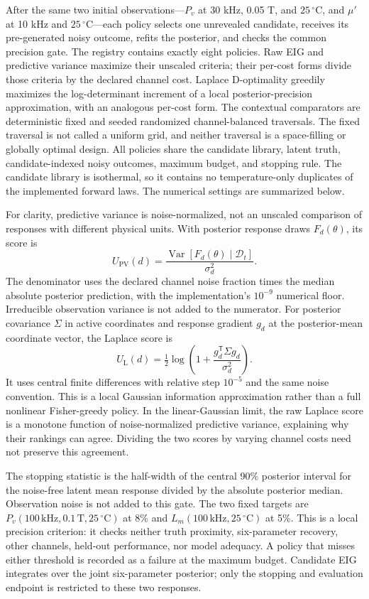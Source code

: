 After the same two initial observations---\(P_v\) at 30 kHz, 0.05 T, and
\(25\,^{\circ}\mathrm C\), and \(\mu'\) at 10 kHz and
\(25\,^{\circ}\mathrm C\)---each policy selects one unrevealed
candidate, receives its pre-generated noisy outcome, refits the
posterior, and checks the common precision gate. The registry contains
exactly eight policies. Raw EIG and predictive variance maximize their
unscaled criteria; their per-cost forms divide those criteria by the
declared channel cost. Laplace D-optimality greedily maximizes the
log-determinant increment of a local posterior-precision approximation,
with an analogous per-cost form. The contextual comparators are
deterministic fixed and seeded randomized channel-balanced traversals.
The fixed traversal is not called a uniform grid, and neither traversal
is a space-filling or globally optimal design. All policies share the
candidate library, latent truth, candidate-indexed noisy outcomes,
maximum budget, and stopping rule. The candidate library is isothermal,
so it contains no temperature-only duplicates of the implemented forward
laws. The numerical settings are summarized below.

For clarity, predictive variance is noise-normalized, not an unscaled
comparison of responses with different physical units. With posterior
response draws \(F_d(\theta)\), its score is \[U_{\mathrm{PV}}(d)=
 \frac{\operatorname{Var}[F_d(\theta)\mid\mathcal D_t]}{\sigma_d^2}.\]
The denominator uses the declared channel noise fraction times the
median absolute posterior prediction, with the implementation's
\(10^{-9}\) numerical floor. Irreducible observation variance is not
added to the numerator. For posterior covariance \(\Sigma\) in active
coordinates and response gradient \(g_d\) at the posterior-mean
coordinate vector, the Laplace score is \[U_{\mathrm L}(d)=\tfrac12\log
 \left(1+\frac{g_d^{\mathsf T}\Sigma g_d}{\sigma_d^2}\right).\] It uses
central finite differences with relative step \(10^{-5}\) and the same
noise convention. This is a local Gaussian information approximation
rather than a full nonlinear Fisher-greedy policy. In the
linear-Gaussian limit, the raw Laplace score is a monotone function of
noise-normalized predictive variance, explaining why their rankings can
agree. Dividing the two scores by varying channel costs need not
preserve this agreement.

The stopping statistic is the half-width of the central 90\% posterior
interval for the noise-free latent mean response divided by the absolute
posterior median. Observation noise is not added to this gate. The two
fixed targets are
\(P_v(100\,\mathrm{kHz},0.1\,\mathrm T,25\,^{\circ}\mathrm C)\) at 8\%
and \(L_m(100\,\mathrm{kHz},25\,^{\circ}\mathrm C)\) at 5\%. This is a
local precision criterion: it checks neither truth proximity,
six-parameter recovery, other channels, held-out performance, nor model
adequacy. A policy that misses either threshold is recorded as a failure
at the maximum budget. Candidate EIG integrates over the joint
six-parameter posterior; only the stopping and evaluation endpoint is
restricted to these two responses.


